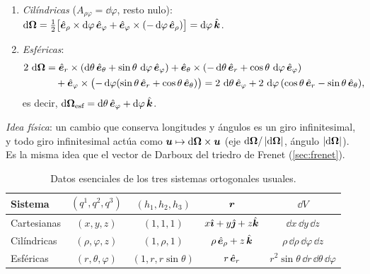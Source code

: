 \begin{observacion}
\begin{enumerate}
  \[
    \Omega_{l}=\tfrac12\sum_{i,j}\varepsilon_{ijl}\,A_{ij},
    \qquad\text{p.\,ej. } \Omega_{3}=\tfrac12(A_{12}-A_{21})=A_{12}.
  \]
  Y esa es la componente $l$ de \eqref{eq:omega-formula}:
  \[
    \sum_{i}\uv{e}_{i}\times\dd\uv{e}_{i}=\sum_{i,j}A_{ij}\,(\uv{e}_{i}\times\uv{e}_{j})
    =\sum_{l}\Bigl(\sum_{i,j}\varepsilon_{ijl}A_{ij}\Bigr)\uv{e}_{l}=2\sum_{l}\Omega_{l}\,\uv{e}_{l}=2\,\dd\vb{\Omega}.
  \]
  \item \emph{Cilíndricas} ($A_{\rho\varphi}=\dd\varphi$, resto nulo):
  $\mathop{}\!\mathrm{d}\bm{\Omega}=\tfrac12\bigl[\hat{\bm{e}}_{\rho}\times\mathop{}\!\mathrm{d}\varphi\,\hat{\bm{e}}_{\varphi}+\hat{\bm{e}}_{\varphi}\times(-\mathop{}\!\mathrm{d}\varphi\,\hat{\bm{e}}_{\rho})\bigr]=\mathop{}\!\mathrm{d}\varphi\,\hat{\bm{k}}$.
  \item \emph{Esféricas}:
  \begin{align*}
    2\,\dd\vb{\Omega}
    &=\er\times(\dd\theta\,\et+\sin\theta\,\dd\varphi\,\ef)+\et\times(-\dd\theta\,\er+\cos\theta\,\dd\varphi\,\ef)\\
    &\quad+\ef\times\bigl(-\dd\varphi(\sin\theta\,\er+\cos\theta\,\et)\bigr)
    =2\,\dd\theta\,\ef+2\,\dd\varphi\,(\cos\theta\,\er-\sin\theta\,\et),
  \end{align*}
  es decir, $\mathop{}\!\mathrm{d}\bm{\Omega}_{\text{esf}}=\mathop{}\!\mathrm{d}\theta\,\hat{\bm{e}}_{\varphi}+\mathop{}\!\mathrm{d}\varphi\,\hat{\bm{k}}$.
\end{enumerate}
\emph{Idea física}: un cambio que conserva longitudes y ángulos es un giro
infinitesimal, y todo giro infinitesimal actúa como $\bm{u}\mapsto\mathop{}\!\mathrm{d}\bm{\Omega}\times\bm{u}$
(eje $\mathop{}\!\mathrm{d}\bm{\Omega}/\left\lvert \mathop{}\!\mathrm{d}\bm{\Omega}\right\rvert$, ángulo $\left\lvert \mathop{}\!\mathrm{d}\bm{\Omega}\right\rvert$). Es la misma idea que el
vector de Darboux del triedro de Frenet (\cref{sec:frenet}).
\end{observacion}

\begin{table}[ht]
\centering
\caption{Datos esenciales de los tres sistemas ortogonales usuales.}
\label{tab:sistemas}
\small
\begin{tabular}{@{}l c c c c@{}}
\toprule
\color{cian} Sistema & \color{cian} $(q^{1},q^{2},q^{3})$ & \color{cian} $(h_{1},h_{2},h_{3})$
 & \color{cian} $\bm{r}$ & \color{cian} $\dd V$\\
\midrule
Cartesianas & $(x,y,z)$ & $(1,1,1)$ & $x\hat{\bm{\imath}}+y\hat{\bm{\jmath}}+z\hat{\bm{k}}$ & $\dd x\,\dd y\,\dd z$\\
Cilíndricas & $(\rho,\varphi,z)$ & $(1,\rho,1)$ & $\rho\,\hat{\bm{e}}_{\rho}+z\,\hat{\bm{k}}$ & $\rho\,\dd\rho\,\dd\varphi\,\dd z$\\
Esféricas & $(r,\theta,\varphi)$ & $(1,r,r\sin\theta)$ & $r\,\hat{\bm{e}}_{r}$ & $r^{2}\sin\theta\,\dd r\,\dd\theta\,\dd\varphi$\\
\bottomrule
\end{tabular}
\end{table}
